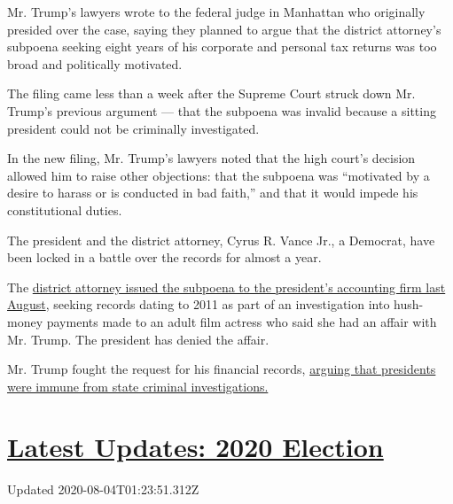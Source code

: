 Mr. Trump's lawyers wrote to the federal judge in Manhattan who
originally presided over the case, saying they planned to argue that the
district attorney's subpoena seeking eight years of his corporate and
personal tax returns was too broad and politically motivated.

The filing came less than a week after the Supreme Court struck down Mr.
Trump's previous argument --- that the subpoena was invalid because a
sitting president could not be criminally investigated.

In the new filing, Mr. Trump's lawyers noted that the high court's
decision allowed him to raise other objections: that the subpoena was
``motivated by a desire to harass or is conducted in bad faith,'' and
that it would impede his constitutional duties.

The president and the district attorney, Cyrus R. Vance Jr., a Democrat,
have been locked in a battle over the records for almost a year.

The
\href{https://www.nytimes.com/2019/09/16/nyregion/trump-tax-returns-cy-vance.html}{district
attorney issued the subpoena to the president's accounting firm last
August}, seeking records dating to 2011 as part of an investigation into
hush-money payments made to an adult film actress who said she had an
affair with Mr. Trump. The president has denied the affair.

Mr. Trump fought the request for his financial records,
\href{https://www.nytimes.com/2019/09/19/nyregion/trump-tax-returns-lawsuit.html}{arguing
that presidents were immune from state criminal investigations.}

\hypertarget{latest-updates-2020-election}{%
\section{\texorpdfstring{\href{https://www.nytimes.com/2020/08/03/us/elections/biden-vs-trump.html?action=click\&pgtype=Article\&state=default\&region=MAIN_CONTENT_1\&context=storylines_live_updates}{Latest
Updates: 2020
Election}}{Latest Updates: 2020 Election}}\label{latest-updates-2020-election}}

Updated 2020-08-04T01:23:51.312Z

